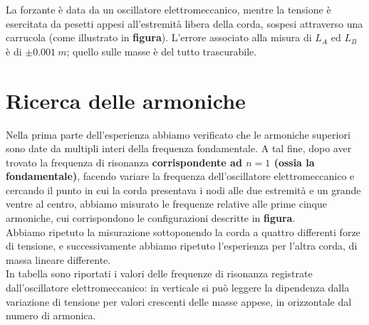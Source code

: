 La forzante è data da un oscillatore elettromeccanico, mentre la tensione è esercitata da pesetti appesi all'estremità libera della corda, sospesi attraverso una carrucola (come illustrato in \textbf{figura}). 
L'errore associato alla misura di $L_A$ ed $L_B$ è di $\pm0.001\ m$; quello sulle masse è del tutto trascurabile. 

\section{Ricerca delle armoniche}

Nella prima parte dell'esperienza abbiamo verificato che le armoniche superiori sono date da multipli interi della frequenza fondamentale. A tal fine, dopo aver trovato la frequenza di risonanza \textbf{corrispondente ad $n=1$ (ossia la fondamentale)}, facendo variare la frequenza dell'oscillatore elettromeccanico e cercando il punto in cui la corda presentava i nodi alle due estremità e un grande ventre al centro, abbiamo misurato le frequenze relative alle prime cinque armoniche, cui corrispondono le configurazioni descritte in \textbf{figura}. 
\\

Abbiamo ripetuto la misurazione sottoponendo la corda a quattro differenti forze di tensione, e successivamente abbiamo ripetuto l'esperienza per l'altra corda, di massa lineare differente. \\
In tabella sono riportati i valori delle frequenze di risonanza registrate dall'oscillatore elettromeccanico: in verticale si può leggere la dipendenza dalla variazione di tensione per valori crescenti delle masse appese, in orizzontale dal numero di armonica.
\\

